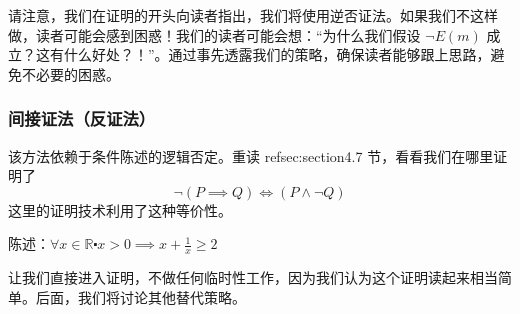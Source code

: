 请注意，我们在证明的开头向读者指出，我们将使用逆否证法。如果我们不这样做，读者可能会感到困惑！我们的读者可能会想：``为什么我们假设 $\neg E(m)$ 成立？这有什么好处？！''。通过事先透露我们的策略，确保读者能够跟上思路，避免不必要的困惑。

\subsubsection*{间接证法（反证法）}

该方法依赖于条件陈述的逻辑否定。重读 ref{sec:section4.7} 节，看看我们在哪里证明了
\[\neg (P \implies Q) \iff (P \land \neg Q)\]
这里的证明技术利用了这种等价性。

\begin{center}
    \noindent {}
\end{center}

\begin{example}[令人惊讶的算术几何平均不等式]

    陈述：$\forall x \in \mathbb{R} \centerdot x > 0 \implies x + \frac{1}{x} \ge 2$
\end{example}

让我们直接进入证明，不做任何临时性工作，因为我们认为这个证明读起来相当简单。后面，我们将讨论其他替代策略。

\begin{center}
    \noindent {}
\end{center}

